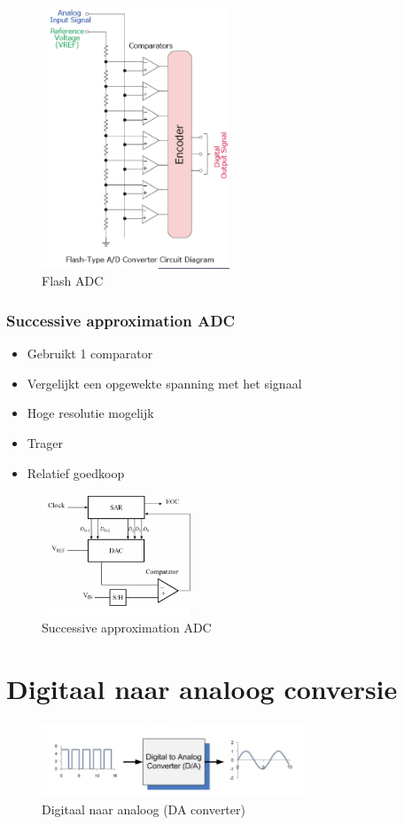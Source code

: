 \documentclass{article}
\begin{document}
\begin{figure}[H]
    \centering
    \includegraphics[width=0.5\textwidth]{Screenshot_20200224_122635.png}
    \caption{Flash ADC}
\end{figure}

\subsubsection{Successive approximation ADC}
\begin{itemize}
    \item Gebruikt 1 comparator
    \item Vergelijkt een opgewekte spanning met het signaal
    \item Hoge resolutie mogelijk
    \item Trager
    \item Relatief goedkoop
\end{itemize}

\begin{figure}[H]
    \centering
    \includegraphics[width=0.4\textwidth]{Screenshot_20200224_122846.png}
    \caption{Successive approximation ADC}
\end{figure}

\section{Digitaal naar analoog conversie}
\begin{figure}[H]
    \centering
    \includegraphics[width=0.7\textwidth]{Screenshot_20200224_115212.png}
    \caption{Digitaal naar analoog (DA converter)}
\end{figure}
\end{document}
